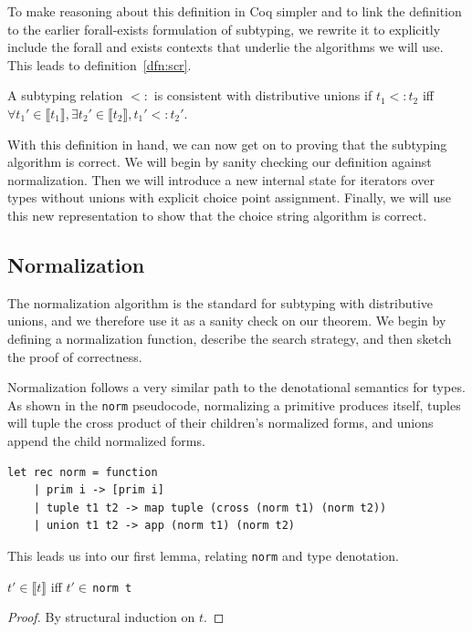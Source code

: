 \documentclass[a4paper,english]{lipics-v2019}
\newcommand{\denotes}[1]{\llbracket #1 \rrbracket}
\begin{document}
To make reasoning about this definition in Coq simpler and to link the
definition to the earlier forall-exists formulation of subtyping, we rewrite
it to explicitly include the forall and exists contexts that underlie the
algorithms we will use. This leads to definition~\ref{dfn:scr}.

\begin{definition}
A subtyping relation $<:$ is consistent with distributive unions if $t_1 <: t_2$ iff $\forall t_1' \in \denotes{t_1},
\exists t_2' \in \denotes{t_2}, t_1' <: t_2'$.
\label{dfn:scr}
\end{definition}

With this definition in hand, we can now get on to proving that the subtyping
algorithm is correct. We will begin by sanity checking our definition against
normalization. Then we will introduce a new internal state for iterators over
types without unions with explicit choice point assignment. Finally, we will use
this new representation to show that the choice string algorithm is correct.

\subsection{Normalization}

The normalization algorithm is the standard for subtyping with distributive 
unions, and we therefore use it as a sanity check on our theorem. We begin by 
defining a normalization function, describe the search strategy, and then sketch
the proof of correctness. 

Normalization follows a very similar path to the denotational semantics for
types. As shown in the \lstinline{norm} pseudocode, normalizing a primitive
produces itself, tuples will tuple the cross product of their children's
normalized forms, and unions append the child normalized forms. 

\begin{lstlisting}
let rec norm = function
    | prim i -> [prim i]
    | tuple t1 t2 -> map tuple (cross (norm t1) (norm t2))
    | union t1 t2 -> app (norm t1) (norm t2)
\end{lstlisting}

This leads us into our first lemma, relating \lstinline{norm} and type denotation.

\begin{lemma}
\label{lem:equiv_ndet}
$t' \in \denotes{t}$ iff $t' \in$\,\lstinline{norm t}
\end{lemma}
\begin{proof}
By structural induction on $t$.
\end{proof}
\end{document}

